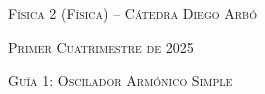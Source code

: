 \documentclass[11pt,spanish]{article}
\begin{document}
    \begin{center}
    \textsc{\large Física 2 (Física) -- Cátedra Diego Arbó}
    \par\end{center}{\large \par}
    
    \begin{center}
    \textsc{\large Primer Cuatrimestre de 2025}
    \par\end{center}{\large \par}
    
    \begin{center}
    \textsc{\large Guía 1: Oscilador Armónico Simple}
    \par\end{center}{\large \par}
\end{document}
